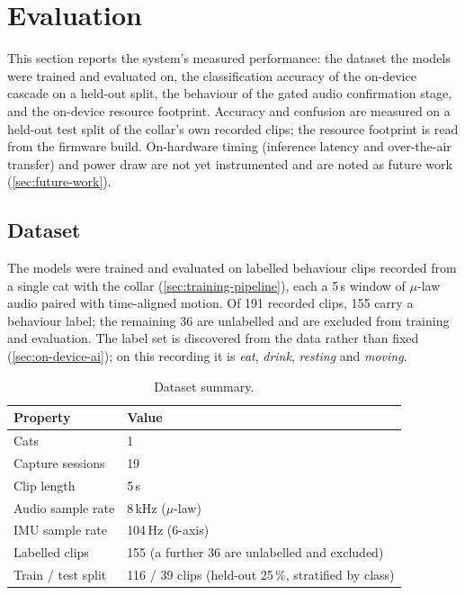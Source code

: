 \section{Evaluation}
\label{sec:evaluation}

This section reports the system's measured performance: the dataset the models were trained and
evaluated on, the classification accuracy of the on-device cascade on a held-out split, the behaviour of
the gated audio confirmation stage, and the on-device resource footprint. Accuracy and confusion are
measured on a held-out test split of the collar's own recorded clips; the resource footprint is read from
the firmware build. On-hardware timing (inference latency and over-the-air transfer) and power draw are
not yet instrumented and are noted as future work (\cref{sec:future-work}).

\subsection{Dataset}

The models were trained and evaluated on labelled behaviour clips recorded from a single cat with the
collar (\cref{sec:training-pipeline}), each a 5\,s window of $\mu$-law audio paired with time-aligned
motion. Of 191 recorded clips, 155 carry a behaviour label; the remaining 36 are unlabelled and are
excluded from training and evaluation. The label set is discovered from the data rather than fixed
(\cref{sec:on-device-ai}); on this recording it is \emph{eat}, \emph{drink}, \emph{resting} and
\emph{moving}.

\begin{table}[ht]
  \centering
  \caption{Dataset summary.}
  \label{tab:dataset}
  \begin{tabularx}{\textwidth}{@{}lX@{}}
    \toprule
    \textbf{Property} & \textbf{Value} \\
    \midrule
    Cats                      & 1 \\
    Capture sessions          & 19 \\
    Clip length               & 5\,s \\
    Audio sample rate         & 8\,kHz ($\mu$-law) \\
    IMU sample rate           & 104\,Hz (6-axis) \\
    Labelled clips            & 155 (a further 36 are unlabelled and excluded) \\
    Train / test split        & 116 / 39 clips (held-out 25\,\%, stratified by class) \\
    \bottomrule
  \end{tabularx}
\end{table}

